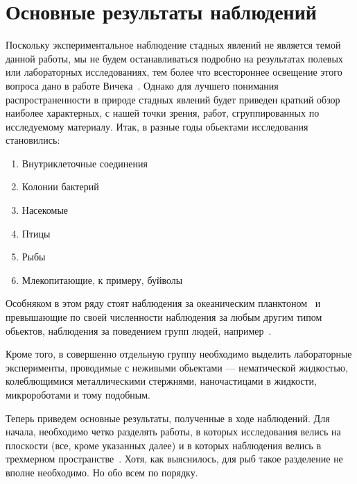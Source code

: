 \section{Основные результаты наблюдений} %
\label{sec:ObservationResults}
	Поскольку экспериментальное наблюдение стадных явлений не является темой данной работы, мы не будем останавливаться подробно на результатах полевых или лабораторных исследованиях, тем более что всестороннее освещение этого вопроса дано в работе Вичека~\cite{vicsek2012}. Однако для лучшего понимания распространенности в природе стадных явлений будет приведен краткий обзор наиболее характерных, с нашей точки зрения, работ, сгруппированных по исследуемому материалу. Итак, в разные годы обьектами исследования становились:
	\begin{enumerate}
		\item Внутриклеточные соединения~\cite{chowdhury2006,keller1971}
		\item Колонии бактерий~\cite{czirok1998,csahok1997}
		\item Насекомые~\cite{buhl2006}
		\item Птицы~\cite{ballerini2008,selous1931,dellariccia2008,biro2006,major1978,nagy2010}
		\item Рыбы~\cite{cambui2012,makris2009,parrish1997}
		\item Млекопитающие, к примеру, буйволы~\cite{sinclair1977}
	\end{enumerate}
	Особняком в этом ряду стоят наблюдения за океаническим планктоном~\cite{seuront2004} и превышающие по своей численности наблюдения за любым другим типом обьектов, наблюдения за поведением групп людей, например~\cite{parisi2009,moussaid2011}.%

	Кроме того, в совершенно отдельную группу необходимо выделить лабораторные эксперименты, проводимые с неживыми обьектами --- нематической жидкостью, колеблющимися металлическими стержнями, наночастицами в жидкости, микророботами и тому подобным.~\cite{schaller2010,turgut2008,blair2003}

	Теперь приведем основные результаты, полученные в ходе наблюдений. Для начала, необходимо четко разделять работы, в которых исследования велись на плоскости (все, кроме указанных далее) и в которых наблюдения велись в трехмерном пространстве~\cite{cullen1965,ballerini2008,major1978,makris2009}. Хотя, как выяснилось, для рыб такое разделение не вполне необходимо. Но обо всем по порядку.

